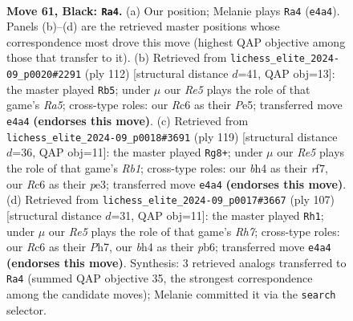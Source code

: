 \documentclass[11pt]{article}
\begin{document}
\clearpage

\begin{figure}[p]\centering
\begin{subfigure}{0.46\textwidth}\centering
\resizebox{\linewidth}{!}{%
\newchessgame
\chessboard[
  setfen={8/5k2/2r5/1R6/4r1bB/6R1/2n2P1K/8 b - - 2 61},
  showmover=false,
  pgfstyle=straightmove, color=movearrow, markmove={e4-a4}
]}
\caption{}
\end{subfigure}\hfill
\begin{subfigure}{0.46\textwidth}\centering
\resizebox{\linewidth}{!}{%
\newchessgame
\chessboard[
  setfen={3k4/8/4b3/R3P3/1p3K2/5B1r/8/8 w - - 1 57},
  showmover=false,
  pgfstyle=straightmove, color=movearrow, markmove={a5-b5}
]}
\caption{}
\end{subfigure}
\\[4pt]
\begin{subfigure}{0.46\textwidth}\centering
\resizebox{\linewidth}{!}{%
\newchessgame
\chessboard[
  setfen={1r6/5R2/3k2K1/7R/8/4P1P1/8/7r b - - 17 60},
  showmover=false,
  pgfstyle=straightmove, color=movearrow, markmove={b8-g8}
]}
\caption{}
\end{subfigure}\hfill
\begin{subfigure}{0.46\textwidth}\centering
\resizebox{\linewidth}{!}{%
\newchessgame
\chessboard[
  setfen={8/7p/1PB5/6k1/3R2b1/2K5/7r/8 b - - 1 54},
  showmover=false,
  pgfstyle=straightmove, color=movearrow, markmove={h2-h1}
]}
\caption{}
\end{subfigure}
\caption{\textbf{Move 61, Black: \texttt{Ra4}.} (a) Our position; Melanie plays \texttt{Ra4} (\texttt{e4a4}). Panels (b)--(d) are the retrieved master positions whose correspondence most drove this move (highest QAP objective among those that transfer to it). (b) Retrieved from \texttt{lichess\_elite\_2024-09\_p0020\#2291} (ply 112) [structural distance $d$=41, QAP obj=13]: the master played \texttt{Rb5}; under $\mu$ our \emph{Re5} plays the role of that game's \emph{Ra5}; cross-type roles: our \emph{R}c6 as their \emph{P}e5; transferred move \texttt{e4a4} \textbf{(endorses this move)}. (c) Retrieved from \texttt{lichess\_elite\_2024-09\_p0018\#3691} (ply 119) [structural distance $d$=36, QAP obj=11]: the master played \texttt{Rg8+}; under $\mu$ our \emph{Re5} plays the role of that game's \emph{Rb1}; cross-type roles: our \emph{b}h4 as their \emph{r}f7, our \emph{R}c6 as their \emph{p}e3; transferred move \texttt{e4a4} \textbf{(endorses this move)}. (d) Retrieved from \texttt{lichess\_elite\_2024-09\_p0017\#3667} (ply 107) [structural distance $d$=31, QAP obj=11]: the master played \texttt{Rh1}; under $\mu$ our \emph{Re5} plays the role of that game's \emph{Rh7}; cross-type roles: our \emph{R}c6 as their \emph{P}h7, our \emph{b}h4 as their \emph{p}b6; transferred move \texttt{e4a4} \textbf{(endorses this move)}. Synthesis: 3 retrieved analogs transferred to \texttt{Ra4} (summed QAP objective 35, the strongest correspondence among the candidate moves); Melanie committed it via the \texttt{search} selector.}
\label{fig:thought-m121}
\end{figure}
\end{document}
